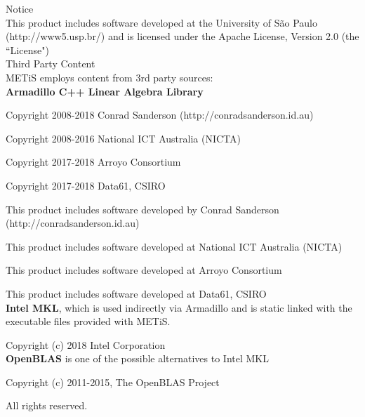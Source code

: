 {\selectfont \LARGE Notice} \\[8pt]
%
This product includes software developed at the University of São Paulo (http://www5.usp.br/) and is licensed under the Apache License, Version 2.0 (the ``License") \\[24pt]




{ \selectfont\LARGE Third Party Content} \\[8pt]
METiS employs content from 3rd party sources: \\[16pt]
%
\textbf{Armadillo C++ Linear Algebra Library}

Copyright 2008-2018 Conrad Sanderson (http://conradsanderson.id.au)

Copyright 2008-2016 National ICT Australia (NICTA)

Copyright 2017-2018 Arroyo Consortium

Copyright 2017-2018 Data61, CSIRO

This product includes software developed by Conrad Sanderson 
(http://conradsanderson.id.au)

This product includes software developed at National ICT Australia (NICTA)

This product includes software developed at Arroyo Consortium

This product includes software developed at Data61, CSIRO \\[24pt]
%
%
%
\textbf{Intel MKL}, which is used indirectly via Armadillo and is static linked with the executable files provided with METiS.

Copyright (c) 2018 Intel Corporation\\[24pt]
%
%
%
\textbf{OpenBLAS} is one of the possible alternatives to Intel MKL

Copyright (c) 2011-2015, The OpenBLAS Project 

All rights reserved.
